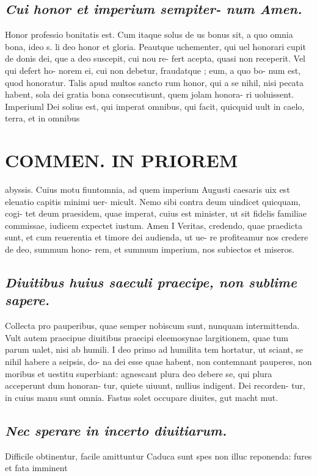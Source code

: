 \documentclass{article}
\begin{document}
\begin{pages}
\subsection*{\textit{Cui honor et imperium sempiter- num Amen. }}\pstart Honor professio bonitatis est. Cum itaque solus de us bonus sit, a quo omnia bona, ideo s. li deo honor et gloria. Peautque uchementer, qui uel honorari cupit de donis dei, que a deo suscepit, cui nou re- fert acepta, quasi non receperit. Vel qui defert ho- norem ei, cui non debetur, fraudatque ; eum, a quo bo- num est, quod honoratur. Talis apud multos sancto rum honor, qui a se nihil, nisi pecata habent, sola dei gratia bona consecutisunt, quem jolam honora- ri uoluissent.  \pend\pstart Imperiuml Dei solius est, qui imperat omnibus, qui facit, quicquid uult in caelo, terra, et in omnibus  \pend
\section*{COMMEN. IN PRIOREM }
\marginpar{[ p.180 ]}\pstart abyssis. Cuius motu fiuntomnia, ad quem imperium Augusti caesaris uix est eleuatio capitis minimi uer- micult. Nemo sibi contra deum uindicet quicquam, cogi- tet deum praesidem, quae imperat, cuius est minister, ut sit fidelis familiae commissae, iudicem expectet iustum.  \pend\pstart Amen I Veritas, credendo, quae praedicta sunt, et cum reuerentia et timore dei audienda, ut ue- re profiteamur nos credere de deo, summum hono- rem, et summum imperium, nos subiectos et miseros.  \pend
{}
{}
\subsection*{\textit{Diuitibus huius saeculi praecipe, non sublime sapere. }}\pstart Collecta pro pauperibus, quae semper nobiscum sunt, nunquam intermittenda. Vult autem praecipue diuitibus praecipi eleemosynae largitionem, quae tum parum ualet, nisi ab humili. I deo primo ad humilita tem hortatur, ut sciant, se nihil habere a seipsis, do- na dei esse quae habent, non contemnant pauperes, non moribus et uestitu superbiant: agnescant plura deo debere se, qui plura acceperunt dum honoran- tur, quiete uiuunt, nullius indigent. Dei recorden- tur, in cuius manu sunt omnia. Fastus solet occupare diuites, gut macht mut.  \pend
{}
{}
\subsection*{\textit{Nec sperare in incerto diuitiarum. }}\pstart Difficile obtinentur, facile amittuntur Caduca sunt spes non illuc reponenda: fures et fata imminent  \pend

\end{pages}
\end{document}
